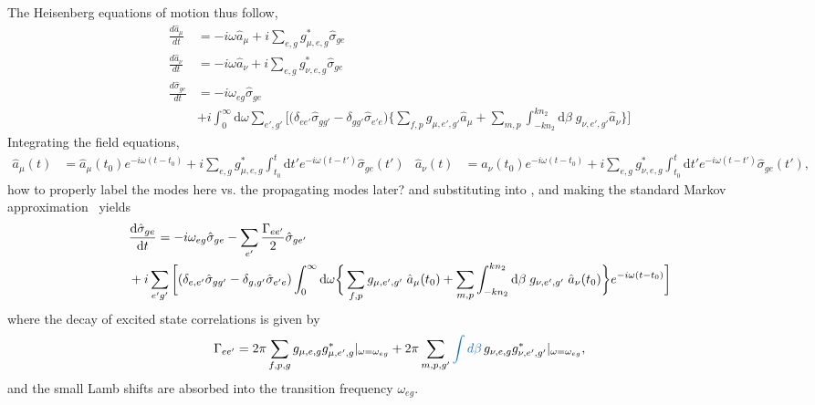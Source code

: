 \documentclass[preprint,aps,pra,onecolumn]{revtex4-1} %
\newcommand{\der}[1]{\frac{d {#1}}{dt}}
\newcommand{\change}[1]{{\color{RoyalBlue} #1}}
\newcommand{\comment}[1]{{\color{Maroon} #1}}
\begin{document}
The Heisenberg equations of motion thus follow,
\begin{align}
\der{\hat{a}_\mu} &= -i\omega \hat{a}_\mu +i\sum_{e,g} g_{\mu, e,g}^* \hat{\sigma}_{ge} \label{eq:da}\\
\der{\hat{a}_\nu} &= -i\omega \hat{a}_\nu +i\sum_{e,g} g_{\nu, e,g}^*  \hat{\sigma}_{ge} \label{eq:danu}\\
\der{\hat{\sigma}_{ge}} &= -i\omega_{eg} \hat{\sigma}_{ge} \nonumber\\
&+ i\int_0^{\infty}\mathrm{d}\omega \sum_{e',g'} \bigg[ \big(\delta_{ee'} \hat{\sigma}_{gg'} - \delta_{gg'} 
\hat{\sigma}_{e'e} \big) \bigg\{ \sum_{f,p}  g_{\mu, e',g'}\hat{a}_\mu +\sum_{m,p}  
\int_{-kn_2}^{kn_2}\mathrm{d}\beta \; g_{\nu, e',g'} \hat{a}_\nu \bigg\} \bigg] \label{Eq::dsigma} 
\end{align}
Integrating the field equations, 
\begin{subequations}\label{eq:aout1}
\begin{align}
\hat{a}_\mu(t) &= \hat{a}_\mu(t_0) e^{-i\omega (t-t_0)} +i \sum_{e,g} g_{\mu,e,g}^* \int_{t_0}^t 
\mathrm{d} t' e^{-i\omega (t-t')}\hat{\sigma}_{ge}(t') \label{Eq::aguidedEOM}
\end{align}
\begin{align}
\hat{a}_\nu (t) &= \hat{a}_\nu (t_0) e^{-i\omega (t-t_0)} +i \sum_{e,g} g_{\nu,e,g}^* \int_{t_0}^t \mathrm{d} 
t' e^{-i\omega (t-t')}\hat{\sigma}_{ge}(t'),
\end{align}
\end{subequations}
\comment{how to properly label the modes here vs. the propagating modes later?} and substituting into , and making the standard Markov approximation~\cite{?} yields
\begin{align}
&\frac{{\mathrm d} {\hat{\sigma}_{ge}}}{{\mathrm d}t} =-i\omega_{eg} 
\hat{\sigma}_{ge}-\sum_{e'}\frac{\Gamma_{ee'}}{2}\hat{\sigma}_{ge'}  \\
&+i \sum_{e'g'}\bigg[ (\delta_{e,e'} \hat{\sigma}_{gg'} - \delta_{g,g'} 
\hat{\sigma}_{e'e})\int_0^{\infty}\mathrm{d}\omega \bigg\{\sum_{f,p}  g_{\mu, e',g'}\; \hat{a}_\mu (t_0) 
+\sum_{m,p}  \int_{-kn_2}^{kn_2}\mathrm{d}\beta \; g_{\nu, e',g'} \;\hat{a}_\nu(t_0) \bigg\} e^{-i\omega 
(t-t_0)}\bigg] \nonumber
\end{align}
where the decay of excited state correlations is given by 
\begin{equation}
\Gamma_{ee'} = 2\pi \sum_{f,p,g} g_{\mu,e,g}g^*_{\mu,e',g} \vert_{\omega=\omega_{eg}}+2\pi 
\sum_{m,p,g'} \change{ \int d\beta } \, g_{\nu,e,g}g^*_{\nu,e',g'} \vert_{\omega=\omega_{eg}},\label{Eq::TotaleeDecayRate}
\end{equation}
\change{and the small Lamb shifts are absorbed into the transition frequency $\omega_{eg}$.} 
\end{document}

